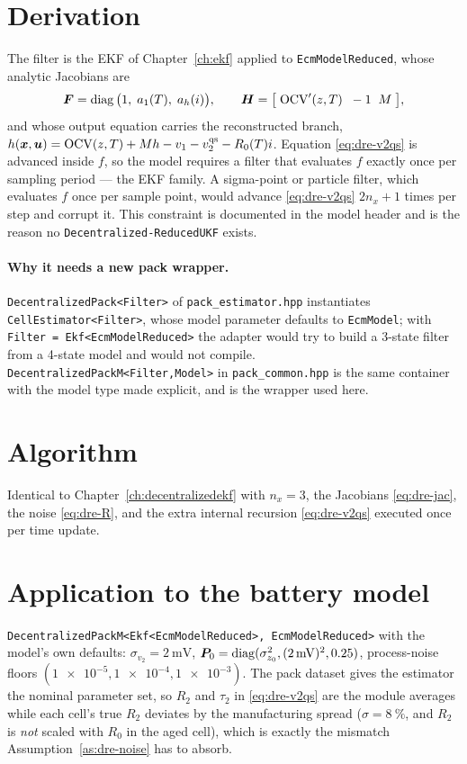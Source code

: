 \section{Derivation}
The filter is the EKF of Chapter~\ref{ch:ekf} applied to \texttt{EcmModelReduced}, whose analytic
Jacobians are
\begin{equation}
\bm{F} = \operatorname{diag}\big(1,\;a_1(T),\;a_h(i)\big),\qquad
\bm{H} = \big[\;\mathrm{OCV}'(z,T)\;\;-1\;\;M\;\big],
\label{eq:dre-jac}
\end{equation}
and whose output equation carries the reconstructed branch,
$h(\bm{x},\bm{u})=\mathrm{OCV}(z,T)+Mh-v_1-v_2^{\text{qs}}-R_0(T)i$. Equation \eqref{eq:dre-v2qs} is advanced
inside $f$, so the model requires a filter that evaluates $f$ exactly once per sampling period ---
the EKF family. A sigma-point or particle filter, which evaluates $f$ once per sample point, would
advance \eqref{eq:dre-v2qs} $2n_x+1$ times per step and corrupt it. This constraint is documented
in the model header and is the reason no \texttt{Decentralized-ReducedUKF} exists.

\paragraph{Why it needs a new pack wrapper.} \texttt{DecentralizedPack<Filter>} of
\texttt{pack\_estimator.hpp} instantiates \texttt{CellEstimator<Filter>}, whose model parameter
defaults to \texttt{EcmModel}; with \texttt{Filter = Ekf<EcmModelReduced>} the adapter would try to
build a 3-state filter from a 4-state model and would not compile. \texttt{DecentralizedPackM<Filter,Model>}
in \texttt{pack\_common.hpp} is the same container with the model type made
explicit, and is the wrapper used here.

\section{Algorithm}
Identical to Chapter~\ref{ch:decentralizedekf} with $n_x=3$, the Jacobians \eqref{eq:dre-jac},
the noise \eqref{eq:dre-R}, and the extra internal recursion \eqref{eq:dre-v2qs} executed once per
time update.

\section{Application to the battery model}
\texttt{DecentralizedPackM<Ekf<EcmModelReduced>, EcmModelReduced>} with the model's own defaults:
$\sigma_{v_2}=\SI{2}{\milli\volt}$, $\bm{P}_0 = \operatorname{diag}(\sigma_{z_0}^2, (\SI{2}{\milli\volt})^2,
\num{0.25})$, process-noise floors $(\num{1e-5},\num{1e-4},\num{1e-3})$. The pack dataset gives the
estimator the nominal parameter set, so $R_2$ and $\tau_2$ in \eqref{eq:dre-v2qs} are the module
averages while each cell's true $R_2$ deviates by the manufacturing spread
($\sigma=\SI{8}{\percent}$, and $R_2$ is \emph{not} scaled with $R_0$ in the aged cell), which is
exactly the mismatch Assumption~\ref{as:dre-noise} has to absorb.

